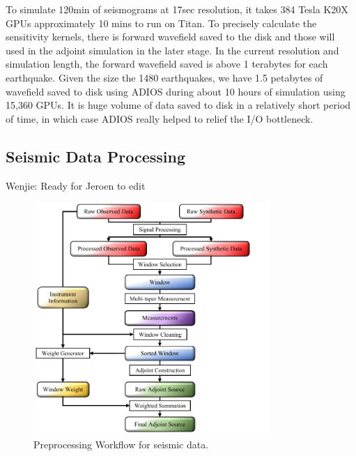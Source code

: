\documentclass[extra,mreferee]{gji}
\begin{document}
To simulate 120min of seismograms at 17sec resolution, it takes 384 Tesla K20X
GPUs approximately 10 mins to run on Titan. To precisely calculate the sensitivity
kernels, there is forward wavefield saved to the disk and those will used in the
adjoint simulation in the later stage. In the current resolution
and simulation length, the forward wavefield saved is above 1 terabytes
for each earthquake. Given the size the 1480 earthquakes, we have 1.5 petabytes of
wavefield saved to disk using ADIOS\citep{liu2014hello} during about 10 hours
of simulation using 15,360 GPUs.
It is huge volume of data saved to disk in a relatively short period of time, in which case
ADIOS really helped to relief the I/O bottleneck.

\subsection{Seismic Data Processing}

{\color{Red} Wenjie: Ready for Jeroen to edit}

\begin{figure}
  \centering
  \includegraphics[width=0.8\textwidth]{figures/Preprocess_workflow.pdf}
  \caption{Preprocessing Workflow for seismic data.}
  \label{fig:preprocess_workflow}
\end{figure}
\end{document}
